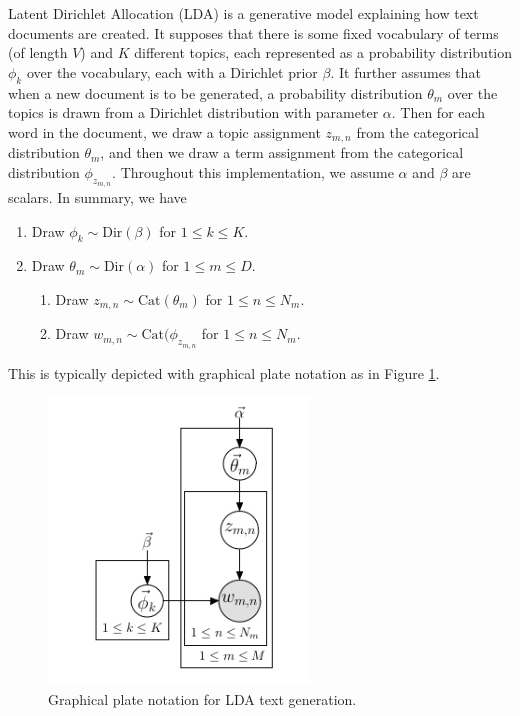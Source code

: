 

Latent Dirichlet Allocation (LDA) is a generative model explaining how text documents are created. It supposes that there is some fixed vocabulary of terms (of length $V$) and $K$ different topics, each represented as a probability distribution $\phi_{k}$ over the vocabulary, each with a Dirichlet prior $\beta$. It further assumes that when a new document is to be generated, a probability distribution $\theta_{m}$ over the topics is drawn from a Dirichlet distribution with parameter $\alpha$. Then for each word in the document, we draw a topic assignment $z_{m,n}$ from the categorical distribution $\theta_{m}$, and then we draw a term assignment from the categorical distribution $\phi_{z_{m,n}}$. Throughout this implementation, we assume $\alpha$ and $\beta$ are scalars. In summary, we have
\begin{enumerate}
	\item Draw $\phi_{k} \sim \text{Dir}(\beta)$ for $1 \leq k \leq K$.
	\item Draw $\theta_{m} \sim \text{Dir}(\alpha)$ for $1 \leq m \leq D$.
	\begin{enumerate}
		\item Draw $z_{m,n} \sim \text{Cat}(\theta_{m})$ for $1 \leq n \leq N_{m}$.
		\item Draw $w_{m,n} \sim \text{Cat}(\phi_{z_{m,n}}$ for $1 \leq n \leq N_{m}$.
	\end{enumerate}
\end{enumerate}

This is typically depicted with graphical plate notation as in Figure \ref{ldaplates}.

\begin{figure}[h]
\begin{center}
\includegraphics[height=3in]{graphicalplate.jpg}
\end{center}
\caption{Graphical plate notation for LDA text generation.}\label{ldaplates}
\end{figure}

